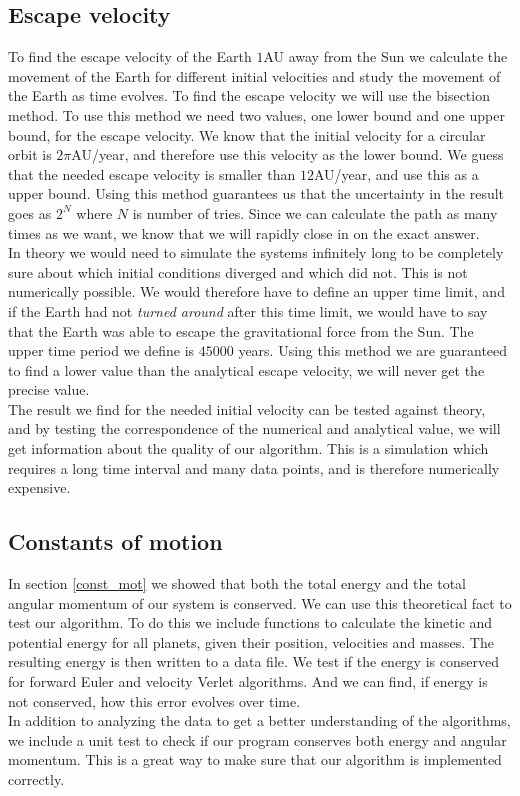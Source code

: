 \documentclass[%
 reprint,
nofootinbib,
aps,
]{revtex4-1}
\begin{document}
\subsection{Escape velocity}
To find the escape velocity of the Earth $1$AU away from the Sun we calculate the movement of the Earth for different initial velocities and study the movement of the Earth as time evolves. To find the escape velocity we will use the bisection method. To use this method we need two values, one lower bound and one upper bound, for the escape velocity. We know that the initial velocity for a circular orbit is $2\pi$AU/year, and therefore use this velocity as the lower bound. We guess that the needed escape velocity is smaller than $12$AU/year, and use this as a upper bound. Using this method guarantees us that the uncertainty in the result goes as $2^N$ where $N$ is number of tries. Since we can calculate the path as many times as we want, we know that we will rapidly close in on the exact answer.
\\In theory we would need to simulate the systems infinitely long to be completely sure about which initial conditions diverged and which did not. This is not numerically possible. We would therefore have to define an upper time limit, and if the Earth had not \textit{turned around} after this time limit, we would have to say that the Earth was able to escape the gravitational force from the Sun. The upper time period we define is $45000$ years. Using this method we are guaranteed to find a lower value than the analytical escape velocity, we will never get the precise value.
\\The result we find for the needed initial velocity can be tested against theory, and by testing the correspondence of the numerical and analytical value, we will get information about the quality of our algorithm. This is a simulation which requires a long time interval and many data points, and is therefore numerically expensive.

\subsection{Constants of motion}
In section \ref{const_mot} we showed that both the total energy and the total angular momentum of our system is conserved. We can use this theoretical fact to test our algorithm. To do this we include functions to calculate the kinetic and potential energy for all planets, given their position, velocities and masses. The resulting energy is then written to a data file. We test if the energy is conserved for forward Euler and velocity Verlet algorithms. And we can find, if energy is not conserved, how this error evolves over time.\\
In addition to analyzing the data to get a better understanding of the algorithms, we include a unit test to check if our program conserves both energy and angular momentum. This is a great way to make sure that our algorithm is implemented correctly.
\end{document}
